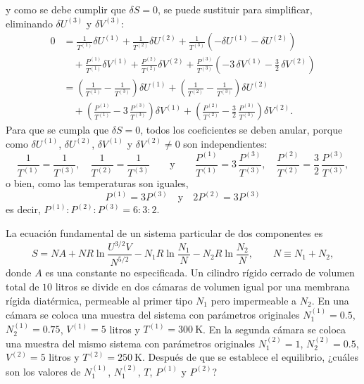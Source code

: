 \begin{solucion}
  y como se debe cumplir que $\delta S=0$, se puede sustituir para simplificar, eliminando
  $\delta U^{(3)}$ y $\delta V^{(3)}$:
  \begin{align*}
    0&=\frac{1}{T^{(1)}}\delta U^{(1)}+\frac{1}{T^{(2)}}\delta U^{(2)}+\frac{1}{T^{(3)}}\left(-\delta U^{(1)}-\delta U^{(2)}\right)\\
     &\quad+\frac{P^{(1)}}{T^{(1)}}\delta V^{(1)}+\frac{P^{(2)}}{T^{(2)}}\delta V^{(2)}+\frac{P^{(3)}}{T^{(3)}}\left(-3\,\delta V^{(1)}-\tfrac{3}{2}\,\delta V^{(2)}\right)\\
     &=\left(\frac{1}{T^{(1)}}-\frac{1}{T^{(3)}}\right)\delta U^{(1)}+\left(\frac{1}{T^{(2)}}-\frac{1}{T^{(3)}}\right)\delta U^{(2)}\\
     &\quad+\left(\frac{P^{(1)}}{T^{(1)}}-3\,\frac{P^{(3)}}{T^{(3)}}\right)\delta V^{(1)}+\left(\frac{P^{(2)}}{T^{(2)}}-\frac{3}{2}\,\frac{P^{(3)}}{T^{(3)}}\right)\delta V^{(2)}.
  \end{align*}
  Para que se cumpla que $\delta S=0$, todos los coeficientes se deben anular, porque como
  $\delta U^{(1)}$, $\delta U^{(2)}$, $\delta V^{(1)}$ y $\delta V^{(2)}\neq0$ son independientes:
  \begin{equation*}
    \frac{1}{T^{(1)}}=\frac{1}{T^{(3)}},\quad\frac{1}{T^{(2)}}=\frac{1}{T^{(3)}}
    \qquad\text{y}\qquad
    \frac{P^{(1)}}{T^{(1)}}=3\,\frac{P^{(3)}}{T^{(3)}},\quad\frac{P^{(2)}}{T^{(2)}}=\frac{3}{2}\,\frac{P^{(3)}}{T^{(3)}},
  \end{equation*}
  o bien, como las temperaturas son iguales,
  \begin{equation*}
    \boxed{P^{(1)}=3P^{(3)}\quad\text{y}\quad2P^{(2)}=3P^{(3)}}
  \end{equation*}
  es decir, $P^{(1)}:P^{(2)}:P^{(3)}=6:3:2$.
\end{solucion}

\begin{ejercicio}[P.\,2.8.1]
  La ecuación fundamental de un sistema particular de dos componentes es
  \begin{equation*}
    S=NA+NR\ln\frac{U^{3/2}V}{N^{5/2}}-N_1R\ln\frac{N_1}{N}-N_2R\ln\frac{N_2}{N},
    \qquad N\equiv N_1+N_2,
  \end{equation*}
  donde $A$ es una constante no especificada. Un cilindro rígido cerrado de volumen total de $10$
  litros se divide en dos cámaras de volumen igual por una membrana rígida diatérmica, permeable al
  primer tipo $N_1$ pero impermeable a $N_2$. En una cámara se coloca una muestra del sistema con
  parámetros originales $N_1^{(1)}=0.5$, $N_2^{(1)}=0.75$, $V^{(1)}=5$ litros y $T^{(1)}=300\ \mathrm{K}$.
  En la segunda cámara se coloca una muestra del mismo sistema con parámetros originales
  $N_1^{(2)}=1$, $N_2^{(2)}=0.5$, $V^{(2)}=5$ litros y $T^{(2)}=250\ \mathrm{K}$. Después de que se
  establece el equilibrio, ¿cuáles son los valores de $N_1^{(1)}$, $N_1^{(2)}$, $T$, $P^{(1)}$ y
  $P^{(2)}$?
\end{ejercicio}

